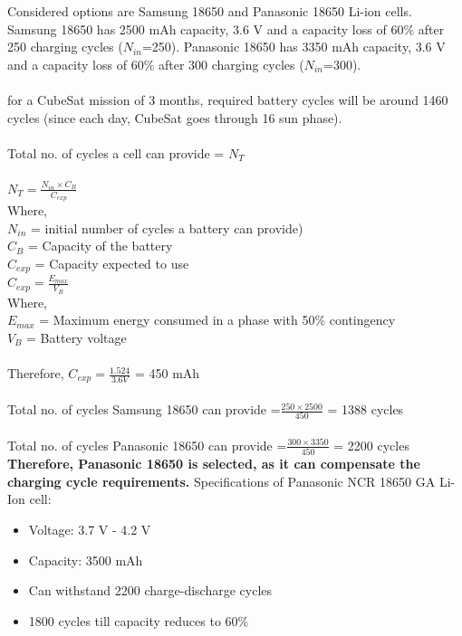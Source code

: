 Considered options are Samsung 18650 and Panasonic 18650 Li-ion cells. Samsung 18650 has 2500 mAh capacity, 3.6 V and a capacity loss of 60\% after 250 charging cycles ($N_{in}$=250). Panasonic 18650 has 3350 mAh capacity, 3.6 V and a capacity loss of 60\% after 300 charging cycles ($N_{in}$=300).\\ \\
for a CubeSat mission of 3 months, required battery cycles will be around 1460 cycles (since each day, CubeSat goes through 16 sun phase).\\ \\
Total no. of cycles a cell can provide = $N_{T}$\\ \\
\hspace*{3cm} $N_{T} = \frac{N_{in} \times C_{B}}{C_{exp}}$
\\ 
Where,\\
$N_{in}$ = initial number of cycles a battery can provide)
\\ $C_{B}$ = Capacity of the battery
\\ $C_{exp}$ = Capacity expected to use\\
\hspace*{3cm} $C_{exp} = \frac{E_{max}}{V_{B}}$
\\ Where,\\
 $E_{max}$ = Maximum energy consumed in a phase with 50\% contingency
\\ $V_{B}$ = Battery voltage\\ \\
Therefore, $C_{exp} = \frac{1.524}{3.6V}$ = 450 mAh \\ \\
Total no. of cycles Samsung 18650 can provide =$\frac{250 \times 2500}{450}$ = 1388 cycles\\ \\
Total no. of cycles Panasonic 18650 can provide =$\frac{300 \times 3350}{450}$ = 2200 cycles\\ 

\textbf{Therefore, Panasonic 18650 is selected, as it can compensate the charging cycle requirements.}
Specifications of Panasonic NCR 18650 GA Li-Ion cell:
\begin{itemize}
	\item Voltage: 3.7 V - 4.2 V
	\item Capacity: 3500 mAh
	\item Can withstand 2200 charge-discharge cycles
	\item 1800 cycles till capacity reduces to 60\%
\end{itemize}
